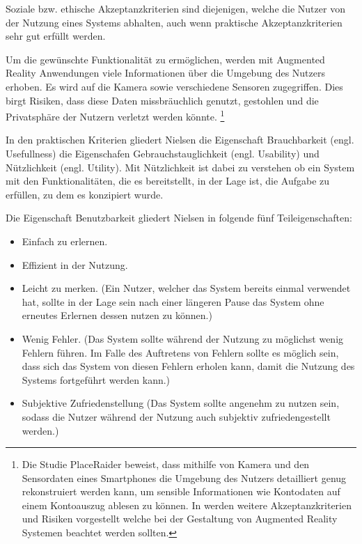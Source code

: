 Soziale bzw. ethische Akzeptanzkriterien sind diejenigen, welche die Nutzer von der Nutzung eines Systems abhalten, auch wenn praktische Akzeptanzkriterien sehr gut erfüllt werden. 

Um die gewünschte Funktionalität zu ermöglichen, werden mit Augmented Reality Anwendungen viele Informationen über die Umgebung des Nutzers erhoben.\cite[S.~3]{Roesner2013} Es wird auf die Kamera sowie verschiedene Sensoren zugegriffen. Dies birgt Risiken, dass diese Daten missbräuchlich genutzt, gestohlen und die Privatsphäre der Nutzern verletzt werden könnte. \footnote{Die Studie PlaceRaider \cite[S.~9]{Templeman2012} beweist, dass mithilfe von Kamera und den Sensordaten eines Smartphones die Umgebung des Nutzers detailliert genug rekonstruiert werden kann, um sensible Informationen wie Kontodaten auf einem Kontoauszug ablesen zu können. In \cite{Roesner2013,Lebeck2018} werden weitere Akzeptanzkriterien und Risiken vorgestellt welche bei der Gestaltung von Augmented Reality Systemen beachtet werden sollten.}

In den praktischen Kriterien gliedert Nielsen die Eigenschaft Brauchbarkeit (engl. Usefullness) die Eigenschafen Gebrauchstauglichkeit (engl. Usability) und Nützlichkeit (engl. Utility). 
Mit Nützlichkeit ist dabei zu verstehen ob ein System mit den Funktionalitäten, die es bereitstellt, in der Lage ist, die Aufgabe zu erfüllen, zu dem es konzipiert wurde.

Die Eigenschaft Benutzbarkeit gliedert Nielsen in folgende fünf Teileigenschaften: 

\begin{itemize}
	\item Einfach zu erlernen.
	\item Effizient in der Nutzung.
	\item Leicht zu merken. (Ein Nutzer, welcher das System bereits einmal verwendet hat, sollte in der Lage sein nach einer längeren Pause das System ohne erneutes Erlernen dessen nutzen zu können.)
	\item Wenig Fehler. (Das System sollte während der Nutzung zu möglichst wenig Fehlern führen. Im Falle des Auftretens von Fehlern sollte es möglich sein, dass sich das System von diesen Fehlern erholen kann, damit die Nutzung des Systems fortgeführt werden kann.)
	\item Subjektive Zufriedenstellung (Das System sollte angenehm zu nutzen sein, sodass die Nutzer während der Nutzung auch subjektiv zufriedengestellt werden.)
\end{itemize}


